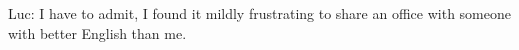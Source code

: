 

Luc: I have to admit, I found it mildly frustrating to share an office with someone with better English than me.